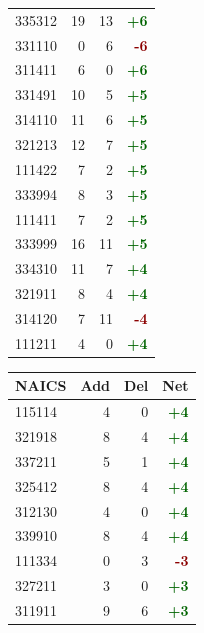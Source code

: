 \documentclass[11pt]{article}
\begin{document}
\begin{table}[H]
\begin{minipage}{0.48\textwidth}
\begin{tabular}{lrrr}
335312 & 19 & 13 & \textcolor{darkgreen}{\textbf{+6}} \\
331110 & 0 & 6 & \textcolor{darkred}{\textbf{-6}} \\
311411 & 6 & 0 & \textcolor{darkgreen}{\textbf{+6}} \\
331491 & 10 & 5 & \textcolor{darkgreen}{\textbf{+5}} \\
314110 & 11 & 6 & \textcolor{darkgreen}{\textbf{+5}} \\
321213 & 12 & 7 & \textcolor{darkgreen}{\textbf{+5}} \\
111422 & 7 & 2 & \textcolor{darkgreen}{\textbf{+5}} \\
333994 & 8 & 3 & \textcolor{darkgreen}{\textbf{+5}} \\
111411 & 7 & 2 & \textcolor{darkgreen}{\textbf{+5}} \\
333999 & 16 & 11 & \textcolor{darkgreen}{\textbf{+5}} \\
334310 & 11 & 7 & \textcolor{darkgreen}{\textbf{+4}} \\
321911 & 8 & 4 & \textcolor{darkgreen}{\textbf{+4}} \\
314120 & 7 & 11 & \textcolor{darkred}{\textbf{-4}} \\
111211 & 4 & 0 & \textcolor{darkgreen}{\textbf{+4}} \\
\bottomrule
\end{tabular}
\end{minipage}
\hfill
\begin{minipage}{0.48\textwidth}
\centering
{}
\begin{tabular}{lrrr}
\toprule
\textbf{NAICS} & \textbf{Add} & \textbf{Del} & \textbf{Net} \\
\midrule
115114 & 4 & 0 & \textcolor{darkgreen}{\textbf{+4}} \\
321918 & 8 & 4 & \textcolor{darkgreen}{\textbf{+4}} \\
337211 & 5 & 1 & \textcolor{darkgreen}{\textbf{+4}} \\
325412 & 8 & 4 & \textcolor{darkgreen}{\textbf{+4}} \\
312130 & 4 & 0 & \textcolor{darkgreen}{\textbf{+4}} \\
339910 & 8 & 4 & \textcolor{darkgreen}{\textbf{+4}} \\
111334 & 0 & 3 & \textcolor{darkred}{\textbf{-3}} \\
327211 & 3 & 0 & \textcolor{darkgreen}{\textbf{+3}} \\
311911 & 9 & 6 & \textcolor{darkgreen}{\textbf{+3}} \\

\end{tabular}
\end{minipage}
\end{table}
\end{document}
